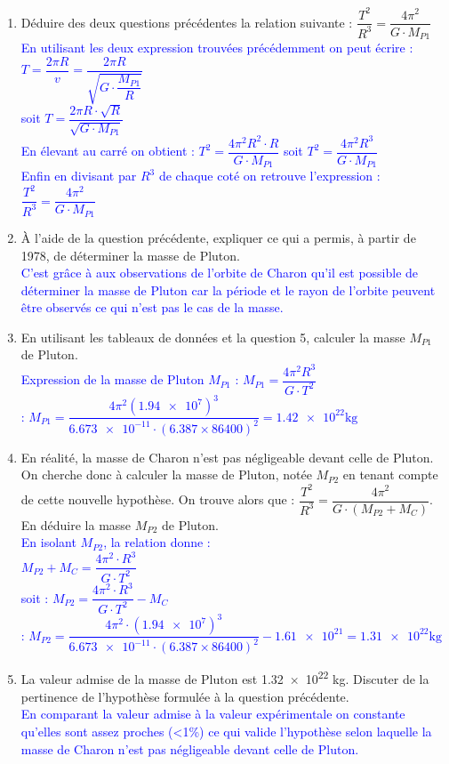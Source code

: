 \documentclass[a4paper,12pt]{article}
\begin{document}
\begin{enumerate}
	\textcolor{blue}{La période T, pour une orbite circulaire et uniforme intervient dans l'expression de la vitesse comme : $v = \dfrac{2 \pi R}{T}$ soit $T = \dfrac{2\pi R}{v}$}
	\item Déduire des deux questions précédentes la relation suivante : $\dfrac{T^2}{R^3} = \dfrac{4\pi^2}{G\cdot M_{P1}}$\\
	\textcolor{blue}{En utilisant les deux expression trouvées précédemment on peut écrire : $T = \dfrac{2\pi R}{v} = \dfrac{2\pi R}{\sqrt{G \cdot \dfrac{M_{P1}}{R}}}$\\
	soit $ T = \dfrac{2\pi R\cdot \sqrt{R}}{\sqrt{G \cdot M_{P1}}}$\\
	En élevant au carré on obtient : $ T^2 = \dfrac{4\pi^2 R^2\cdot R}{G \cdot M_{P1}}$ soit $T^2 = \dfrac{4\pi^2 R^3}{G \cdot M_{P1}}$\\
	Enfin en divisant par $R^3$ de chaque coté on retrouve l'expression : $\dfrac{T^2}{R^3} = \dfrac{4\pi^2}{G\cdot M_{P1}}$}
	\item À l'aide de la question précédente, expliquer ce qui a permis, à partir de 1978, de déterminer la masse de Pluton.\\
	\textcolor{blue}{C'est grâce à aux observations de l'orbite de Charon qu'il est possible de déterminer la masse de Pluton car la période et le rayon de l'orbite peuvent être observés ce qui n'est pas le cas de la masse.}
	\item En utilisant les tableaux de données et la question 5, calculer la masse $M_{P1}$ de Pluton.\\
	\textcolor{blue}{Expression de la masse de Pluton $M_{P1}$ :
	$M_{P1}= \dfrac{4\pi^2 R^3}{G \cdot T^2 }$\\
	 : $M_{P1}= \dfrac{4\pi^2 (\num{1,94e7})^3}{\num{6,673e-11} \cdot (\num{6,387} \times \num{86400})^2 } = \num{1,42e22}\unit{\kilo\gram}$ }
	\item En réalité, la masse de Charon n'est pas négligeable devant celle de Pluton. On cherche donc à calculer la masse de Pluton, notée $M_{P2}$ en tenant compte de cette nouvelle hypothèse. On trouve alors que : $\dfrac{T^2}{R^3} = \dfrac{4\pi^2}{G\cdot (M_{P2}+M_C)}$.
	En déduire la masse $M_{P2}$ de Pluton.\\
	\textcolor{blue}{En isolant $M_{P2}$, la relation donne :\\
	$ M_{P2}+M_C= \dfrac{4\pi^2\cdot R^3}{G\cdot T^2}$\\
	soit : $ M_{P2}= \dfrac{4\pi^2\cdot R^3}{G\cdot T^2} - M_C$\\
	 : $ M_{P2}= \dfrac{4\pi^2\cdot (\num{1,94e7})^3}{\num{6,673e-11}\cdot (\num{6,387} \times \num{86400})^2} - \num{1,61e21} = \num{1,31e22}\unit{\kilo\gram}$}
	\item La valeur admise de la masse de Pluton est \num{1,32e22} \unit{\kilo\gram}. Discuter de la pertinence de l'hypothèse formulée à la question précédente.\\
	\textcolor{blue}{En comparant la valeur admise à la valeur expérimentale on constante qu'elles sont assez proches (<1\%) ce qui valide l'hypothèse selon laquelle la masse de Charon n'est pas négligeable devant celle de Pluton.}
\end{enumerate}
\newpage
\end{document}

